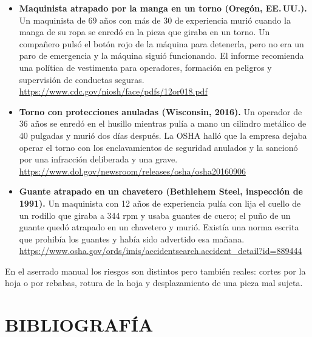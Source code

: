 \documentclass[12pt,a4paper]{article}
\begin{document}
\begin{itemize}
	\item \textbf{Maquinista atrapado por la manga en un torno (Oregón,
		      EE.\,UU.).}
	      Un maquinista de 69 años con más de 30 de experiencia murió cuando la
	      manga de su ropa se enredó en la pieza que giraba en un torno. Un
	      compañero pulsó el botón rojo de la máquina para detenerla, pero no era
	      un paro de emergencia y la máquina siguió funcionando. El informe
	      recomienda una política de vestimenta para operadores, formación en
	      peligros y supervisión de conductas seguras. \\
	      \url{https://www.cdc.gov/niosh/face/pdfs/12or018.pdf}\\[-4pt]
	\item \textbf{Torno con protecciones anuladas (Wisconsin, 2016).} Un operador
	      de 36 años se enredó en el husillo mientras pulía a mano un cilindro
	      metálico de 40 pulgadas y murió dos días después. La OSHA halló que la
	      empresa dejaba operar el torno con los enclavamientos de seguridad
	      anulados y la sancionó por una infracción deliberada y una grave. \\
	      \url{https://www.dol.gov/newsroom/releases/osha/osha20160906}\\[-4pt]
	\item \textbf{Guante atrapado en un chavetero (Bethlehem Steel, inspección de
		      1991).} Un
	      maquinista con 12 años de experiencia pulía con lija el cuello de un
	      rodillo que giraba a 344 rpm y usaba guantes de cuero; el puño de un
	      guante quedó atrapado en un chavetero y murió. Existía una norma escrita
	      que prohibía los guantes y había sido advertido esa mañana. \\
	      \url{https://www.osha.gov/ords/imis/accidentsearch.accident_detail?id=889444}
\end{itemize}

En el aserrado manual los riesgos son distintos pero también reales: cortes por
la hoja o por rebabas, rotura de la hoja y desplazamiento de una pieza mal
sujeta.

\section{BIBLIOGRAFÍA}
\end{document}
